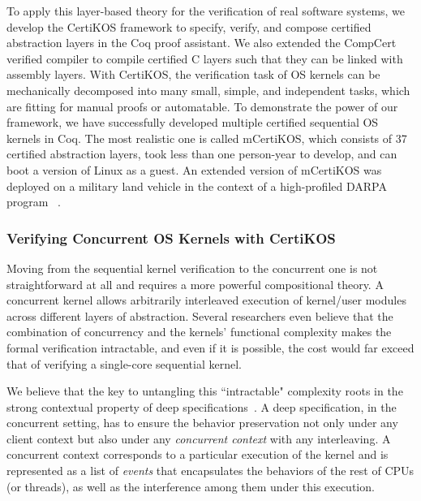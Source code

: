 \documentclass[a4paper, 10pt]{article}
\begin{document}
\begin{small}
To apply this layer-based theory for the verification of real software systems,
we develop the CertiKOS framework to  specify,  verify,  and compose certified abstraction layers  in the Coq proof assistant.
We also extended
the CompCert verified compiler to compile certified C layers such
that they can be linked with assembly layers.
With CertiKOS, the verification task of OS kernels
can be mechanically decomposed into many small, simple, and
independent tasks, which are fitting for manual proofs or automatable.
To demonstrate the power of our  framework,
 we have successfully developed multiple certified
sequential OS kernels in Coq. 
The most realistic one is called mCertiKOS,
which consists of 37 certified abstraction layers, 
took less than one person-year to develop,
and can boot a version of Linux as a guest.
An extended version of mCertiKOS was deployed on a military land vehicle in the context of a high-profiled  DARPA program
~\cite{hacms}.

\subsubsection*{\small Verifying Concurrent OS Kernels with CertiKOS}
Moving from the sequential kernel verification
to the concurrent one is not straightforward at all
and requires a more powerful compositional theory.
A concurrent kernel allows arbitrarily  interleaved
execution of kernel/user modules across different
layers of abstraction. 
Several researchers even believe that the combination of concurrency and the kernels' functional complexity makes the formal verification intractable,
and even if it is possible, the cost would far exceed that of
verifying a single-core sequential kernel.

We believe that the key to untangling this ``intractable" complexity roots in the
strong contextual property of deep specifications~\cite{osdi16-gu}.
A deep specification, in the concurrent setting, has to ensure   the behavior preservation not only under any client context but also under
any \emph{concurrent context} with any interleaving.
A  concurrent context corresponds to
a particular execution of the kernel  and is represented as a list of \emph{events} that encapsulates the behaviors of the rest of CPUs (or threads), as well as the interference
among them under this  execution.


\end{small}
\end{document}
